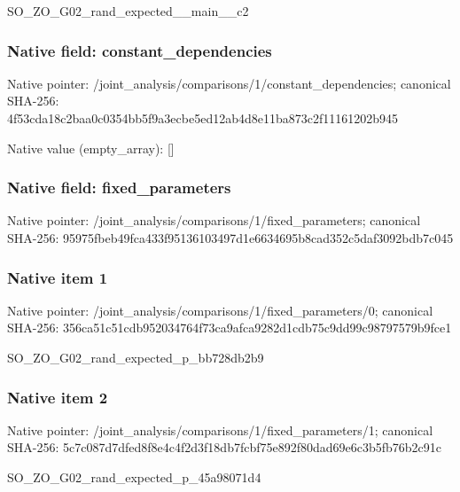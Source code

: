 \documentclass[10pt,a4paper]{article}
\begin{document}
\begingroup\raggedright\sloppy SO\_\allowbreak{}ZO\_\allowbreak{}G02\_\allowbreak{}rand\_\allowbreak{}expected\_\allowbreak{}\_\allowbreak{}main\_\allowbreak{}\_\allowbreak{}c2\par\endgroup

\subsubsection{Native field: constant\_\allowbreak{}dependencies}
Native pointer: /joint\_\allowbreak{}analysis/comparisons/1/constant\_\allowbreak{}dependencies; canonical SHA-256: 4f53cda18c2baa0c0354bb5f9a3ecbe5ed12ab4d8e11ba873c2f11161202b945

Native value (empty\_\allowbreak{}array): []

\subsubsection{Native field: fixed\_\allowbreak{}parameters}
Native pointer: /joint\_\allowbreak{}analysis/comparisons/1/fixed\_\allowbreak{}parameters; canonical SHA-256: 95975fbeb49fca433f95136103497d1e6634695b8cad352c5daf3092bdb7c045

\subsubsection{Native item 1}
Native pointer: /joint\_\allowbreak{}analysis/comparisons/1/fixed\_\allowbreak{}parameters/0; canonical SHA-256: 356ca51c51cdb952034764f73ca9afca9282d1cdb75c9dd99c98797579b9fce1

\begingroup\raggedright\sloppy SO\_\allowbreak{}ZO\_\allowbreak{}G02\_\allowbreak{}rand\_\allowbreak{}expected\_\allowbreak{}p\_\allowbreak{}bb728db2b9\par\endgroup

\subsubsection{Native item 2}
Native pointer: /joint\_\allowbreak{}analysis/comparisons/1/fixed\_\allowbreak{}parameters/1; canonical SHA-256: 5c7c087d7dfed8f8e4c4f2d3f18db7fcbf75e892f80dad69e6c3b5fb76b2c91c

\begingroup\raggedright\sloppy SO\_\allowbreak{}ZO\_\allowbreak{}G02\_\allowbreak{}rand\_\allowbreak{}expected\_\allowbreak{}p\_\allowbreak{}45a98071d4\par\endgroup
\end{document}
